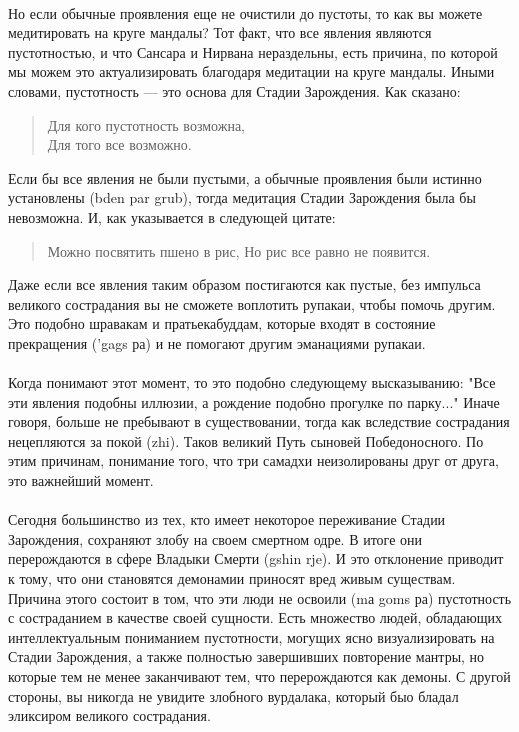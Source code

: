\begin{siderules}
\paragraph{}
Но если обычные проявления еще не очистили до пустоты, то как вы можете медитировать
на круге мандалы? Тот факт, что все явления являются пустотностью, и что Сансара и
Нирвана нераздельны, есть причина, по которой мы можем это актуализировать благодаря
медитации на круге мандалы. Иными словами, пустотность — это основа для Стадии Зарождения.
Как сказано:
\begin{verse}
Для кого пустотность возможна,\\
Для того все возможно.\\
\end{verse}
Если бы все явления не были пустыми, а обычные проявления были истинно установлены
(bden par grub), тогда медитация Стадии Зарождения была бы невозможна. И, как
указывается в следующей цитате:
\begin{verse}
Можно посвятить пшено в рис,
Но рис все равно не появится.
\end{verse}
Даже если все явления таким образом постигаются как пустые, без импульса великого
сострадания вы не сможете воплотить рупакаи, чтобы помочь другим. Это подобно
шравакам и пратьекабуддам, которые входят в состояние прекращения ('gags ра) и не
помогают другим эманациями рупакаи.\\
\\
Когда понимают этот момент, то это подобно следующему высказыванию: "Все эти явления
подобны иллюзии, а рождение подобно прогулке по парку..." Иначе говоря, больше не
пребывают в существовании, тогда как вследствие сострадания нецепляются за покой (zhi).
Таков великий Путь сыновей Победоносного. По этим причинам, понимание того, что три
самадхи неизолированы друг от друга, это важнейший момент.\\
\\
Сегодня большинство из тех, кто имеет некоторое переживание Стадии Зарождения,
сохраняют злобу на своем смертном одре. В итоге они перерождаются в сфере Владыки
Смерти (gshin rje). И это отклонение приводит к тому, что они становятся демонамии
приносят вред живым существам. Причина этого состоит в том, что эти люди не освоили (mа
goms ра) пустотность с состраданием в качестве своей сущности. Есть множество людей,
обладающих интеллектуальным пониманием пустотности, могущих ясно визуализировать на
Стадии Зарождения, а также полностью завершивших повторение мантры, но которые тем не
менее заканчивают тем, что перерождаются как демоны. С другой стороны, вы никогда не
увидите злобного вурдалака, который быо бладал эликсиром великого сострадания.
\end{siderules}

